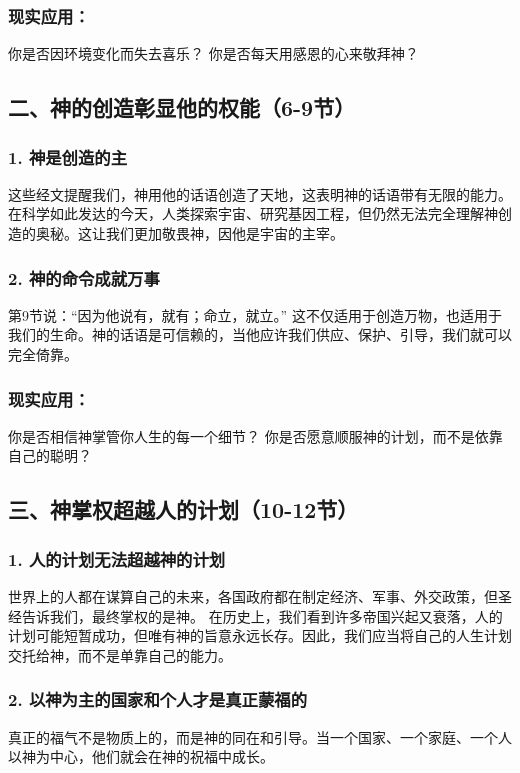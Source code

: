 \documentclass[a4paper, 12pt]{article}
\begin{document}
\subsubsection*{现实应用：}
你是否因环境变化而失去喜乐？
你是否每天用感恩的心来敬拜神？
\subsection*{二、神的创造彰显他的权能（6-9节）}

\subsubsection*{1. 神是创造的主}
这些经文提醒我们，神用他的话语创造了天地，这表明神的话语带有无限的能力。
在科学如此发达的今天，人类探索宇宙、研究基因工程，但仍然无法完全理解神创造的奥秘。这让我们更加敬畏神，因他是宇宙的主宰。

\subsubsection*{2. 神的命令成就万事}
第9节说：“因为他说有，就有；命立，就立。” 这不仅适用于创造万物，也适用于我们的生命。神的话语是可信赖的，当他应许我们供应、保护、引导，我们就可以完全倚靠。

\subsubsection*{现实应用：}
你是否相信神掌管你人生的每一个细节？
你是否愿意顺服神的计划，而不是依靠自己的聪明？
\subsection*{三、神掌权超越人的计划（10-12节）}

\subsubsection*{1. 人的计划无法超越神的计划}
世界上的人都在谋算自己的未来，各国政府都在制定经济、军事、外交政策，但圣经告诉我们，最终掌权的是神。
在历史上，我们看到许多帝国兴起又衰落，人的计划可能短暂成功，但唯有神的旨意永远长存。因此，我们应当将自己的人生计划交托给神，而不是单靠自己的能力。

\subsubsection*{2. 以神为主的国家和个人才是真正蒙福的}
真正的福气不是物质上的，而是神的同在和引导。当一个国家、一个家庭、一个人以神为中心，他们就会在神的祝福中成长。
\end{document}
